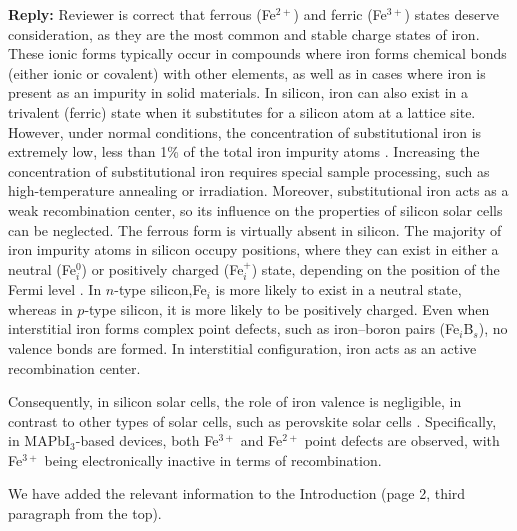 \documentclass[a4paper,fleqn]{cas-sc}
\begin{document}
\noindent
\textcolor[rgb]{0.51,0.00,0.00}{\textbf{Reply:}}
Reviewer is correct that ferrous (Fe$^{2+}$) and ferric (Fe$^{3+}$) states deserve consideration,
as they are the most common and stable charge states of iron.
These ionic forms typically occur in compounds where iron forms chemical bonds (either ionic or covalent) with other elements,
as well as in cases where iron is present as an impurity in solid materials.
In silicon, iron can also exist in a trivalent (ferric) state when it substitutes for a silicon atom at a lattice site.
However, under normal conditions, the concentration of substitutional iron is extremely low, less than 1\% of the total iron impurity atoms \cite{Wright2016}.
Increasing the concentration of substitutional iron requires special sample processing, such as high-temperature annealing or irradiation.
Moreover, substitutional iron acts as a weak recombination center,
so its influence on the properties of silicon solar cells can be neglected.
The ferrous form is virtually absent in silicon.
The majority of iron impurity atoms in silicon occupy positions,
where they can exist in either a neutral (Fe$_i^0$) or positively charged (Fe$_i^+$) state,
depending on the position of the Fermi level \cite{Istratov1999}.
In $n$-type silicon,Fe$_i$ is more likely to exist in a neutral state,
whereas in $p$-type silicon, it is more likely to be positively charged.
Even when interstitial iron forms complex point defects, such as iron–boron pairs (Fe$_i$B$_s$), no valence bonds are formed.
In interstitial configuration, iron acts as an active recombination center.

Consequently, in silicon solar cells, the role of iron valence is negligible,
in contrast to other types of solar cells, such as perovskite solar cells \cite{Poindexter2017}.
Specifically, in MAPbI$_3$-based devices, both Fe$^{3+}$ and Fe$^{2+}$  point defects are observed,
with Fe$^{3+}$ being electronically inactive in terms of recombination.

We have added the relevant information to the Introduction (page 2, third paragraph from the top).
\end{document}
